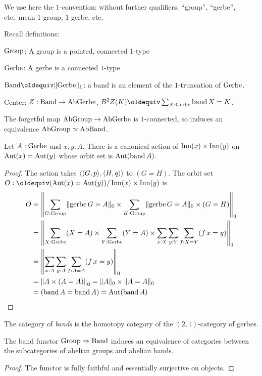 \label{ch:gerbes}

We use here the $1$-convention: without further qualifiers, ``group'',
``gerbe'', etc.~mean $1$-group, $1$-gerbe, etc.

Recall definitions:

$\Group$: A group is a pointed, connected $1$-type

$\Gerbe$: A gerbe is a connected $1$-type

$\Band\jdeq\Trunc{\Gerbe}_1$: a band is an element of the
$1$-truncation of $\Gerbe$.

Center: $Z : \Band \to \AbGerbe$, $B^2Z(K) \jdeq \sum_{X : \Gerbe}
\band X = K$.

The forgetful map $\AbGroup \to \AbGerbe$ is $1$-connected, so induces
an equivalence $\AbGroup \equiv \AbBand$.

\begin{lemma}
  Let $A : \Gerbe$ and $x,y:A$. There is a canonical action of
  $\Inn(x)\times\Inn(y)$ on $\Aut(x) = \Aut(y)$ whose orbit set is
  $\Aut(\band A)$.
\end{lemma}
\begin{proof}
  The action takes $\angled{\angled{G,p},\angled{H,q}}$ to $(G=H)$.
  The orbit set $O \defeq (\Aut(x)=\Aut(y)) / \Inn(x)\times\Inn(y)$ is
  \begin{align*}
    O
    &= \Trunc*{\sum_{G:\Group}\Trunc{\gerbe G=A}_0 \times
      \sum_{H:\Group}\Trunc{\gerbe G=A}_0 \times (G = H)}_0 \\
    &= \Trunc*{\sum_{X:\Gerbe}(X=A) \times
      \sum_{Y:\Gerbe}(Y=A) \times \sum_{x:X}\sum_{y:Y}\sum_{f:X=Y}(\mathop
      f x = y)}_0 \\
    &= \Trunc*{\sum_{x:A}\sum_{y:A}\sum_{f:A=A}(\mathop f x = y)}_0 \\
    &= \Trunc*{A \times (A = A)}_0 = \Trunc A_0 \times \Trunc{A=A}_0 \\
    &= (\band A = \band A) = \Aut(\band A) \qedhere
  \end{align*}
\end{proof}

\begin{definition}
  The category of \emph{bands} is the homotopy category of the
  $(2,1)$-category of gerbes.
\end{definition}
\begin{lemma} %
  The band functor $\Group \Rightarrow \Band$ induces an equivalence
  of categories between the subcategories of abelian groups and
  abelian bands.
\end{lemma}
\begin{proof}
  The functor is fully faithful and essentially surjective on objects.
\end{proof}

